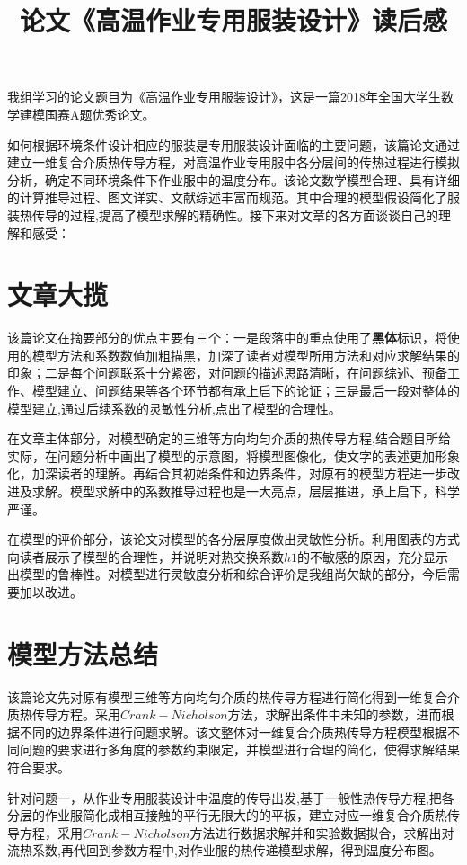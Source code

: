 \documentclass{whutmod}
\title{论文《高温作业专用服装设计》读后感}
\begin{document}
	
	\maketitle
\Large   
我组学习的论文题目为《高温作业专用服装设计》，这是一篇2018年全国大学生数学建模国赛A题优秀论文。

如何根据环境条件设计相应的服装是专用服装设计面临的主要问题，该篇论文通过建立一维复合介质热传导方程，对高温作业专用服中各分层间的传热过程进行模拟分析，确定不同环境条件下作业服中的温度分布。该论文数学模型合理、具有详细的计算推导过程、图文详实、文献综述丰富而规范。其中合理的模型假设简化了服装热传导的过程,提高了模型求解的精确性。接下来对文章的各方面谈谈自己的理解和感受：

\section{文章大揽}
该篇论文在摘要部分的优点主要有三个：一是段落中的重点使用了\textbf{黑体}标识，将使用的模型方法和系数数值加粗描黑，加深了读者对模型所用方法和对应求解结果的印象；二是每个问题联系十分紧密，对问题的描述思路清晰，在问题综述、预备工作、模型建立、问题结果等各个环节都有承上启下的论证；三是最后一段对整体的模型建立,通过后续系数的灵敏性分析,点出了模型的合理性。

在文章主体部分，对模型确定的三维等方向均匀介质的热传导方程,结合题目所给实际，在问题分析中画出了模型的示意图，将模型图像化，使文字的表述更加形象化，加深读者的理解。再结合其初始条件和边界条件，对原有的模型方程进一步改进及求解。模型求解中的系数推导过程也是一大亮点，层层推进，承上启下，科学严谨。

在模型的评价部分，该论文对模型的各分层厚度做出灵敏性分析。利用图表的方式向读者展示了模型的合理性，并说明对热交换系数$h1$的不敏感的原因，充分显示出模型的鲁棒性。对模型进行灵敏度分析和综合评价是我组尚欠缺的部分，今后需要加以改进。


\section{模型方法总结}
该篇论文先对原有模型三维等方向均匀介质的热传导方程进行简化得到一维复合介质热传导方程。采用$Crank-Nicholson$方法，求解出条件中未知的参数，进而根据不同的边界条件进行问题求解。该文整体对一维复合介质热传导方程模型根据不同问题的要求进行多角度的参数约束限定，并模型进行合理的简化，使得求解结果符合要求。

针对问题一，从作业专用服装设计中温度的传导出发,基于一般性热传导方程,把各分层的作业服简化成相互接触的平行无限大的的平板，建立对应一维复合介质热传导方程，采用$Crank-Nicholson$方法进行数据求解并和实验数据拟合，求解出对流热系数,再代回到参数方程中,对作业服的热传递模型求解，得到温度分布图。
\end{document}
